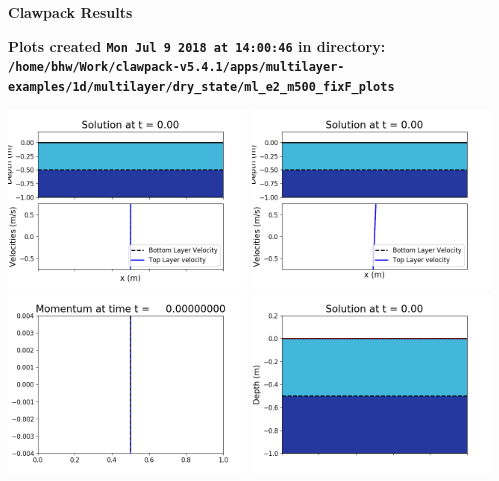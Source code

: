 \documentclass[11pt]{article}
\begin{document}
        \begin{center}{\Large\bf Clawpack Results}\vskip 5pt
        
        \bf Plots created {\tt Mon Jul  9 2018 at 14:00:46} in directory: \vskip 5pt
        \verb+/home/bhw/Work/clawpack-v5.4.1/apps/multilayer-examples/1d/multilayer/dry_state/ml_e2_m500_fixF_plots+
        \end{center}
        \vskip 5pt
        \includegraphics[width=0.475\textwidth]{frame0000fig1001.png}
\includegraphics[width=0.475\textwidth]{frame0000fig1002.png}
\vskip 10pt 
\includegraphics[width=0.475\textwidth]{frame0000fig1003.png}
\includegraphics[width=0.475\textwidth]{frame0000fig1006.png}
\end{document}

